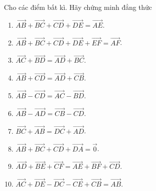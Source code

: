\begin{bt}%
	Cho các điểm bất kì. Hãy chứng minh đẳng thức
	\begin{enumerate}
		\item $\overrightarrow{AB}+\overrightarrow{BC}+\overrightarrow{CD}+\overrightarrow{DE}=\overrightarrow{AE}$.
		\item $\overrightarrow{AB}+\overrightarrow{BC}+\overrightarrow{CD}+\overrightarrow{DE}+\overrightarrow{EF}=\overrightarrow{AF}$.
		\item $\overrightarrow{AC}+\overrightarrow{BD}=\overrightarrow{AD}+\overrightarrow{BC}$.
		\item $\overrightarrow{AB}+\overrightarrow{CD}=\overrightarrow{AD}+\overrightarrow{CB}$.
		\item $\overrightarrow{AB}-\overrightarrow{CD}=\overrightarrow{AC}-\overrightarrow{BD}$.
		\item $\overrightarrow{AB}-\overrightarrow{AD}=\overrightarrow{CB}-\overrightarrow{CD}$.
		\item $\overrightarrow{BC}+\overrightarrow{AB}=\overrightarrow{DC}+\overrightarrow{AD}$.
		\item $\overrightarrow{AB}+\overrightarrow{BC}+\overrightarrow{CD}+\overrightarrow{DA}=\overrightarrow{0}$.
		\item $\overrightarrow{AD}+\overrightarrow{BE}+\overrightarrow{CF}=\overrightarrow{AE}+\overrightarrow{BF}+\overrightarrow{CD}$.
		\item $\overrightarrow{AC}+\overrightarrow{DE}-\overrightarrow{DC}-\overrightarrow{CE}+\overrightarrow{CB}=\overrightarrow{AB}$.
	\end{enumerate}
\end{bt}
